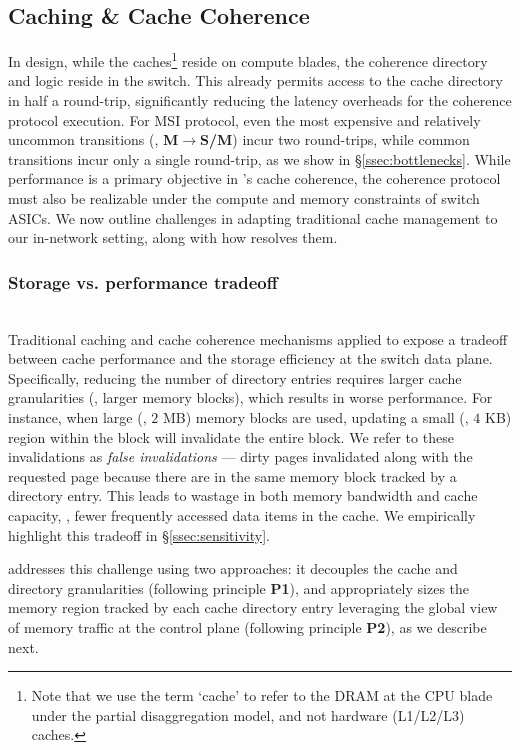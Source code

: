 \subsection{Caching \& Cache Coherence}
\label{ssec:caching}

In \mind design, while the caches\footnote{Note that we use the term `cache' to refer to the DRAM at the CPU blade under the partial disaggregation model, and not hardware (L1/L2/L3) caches.} reside on compute blades, the coherence directory and logic reside in the switch. This already permits access to the cache directory in half a round-trip, significantly reducing the latency overheads for the coherence protocol execution. For MSI protocol, even the most expensive and relatively uncommon transitions (\ie, \textbf{M}$\rightarrow$\textbf{S/M}) incur two round-trips, while common transitions incur only a single round-trip, as we show in \S\ref{ssec:bottlenecks}. While performance is a primary objective in \mind's cache coherence, the coherence protocol must also be realizable under the compute and memory constraints of switch ASICs. We now outline challenges in adapting traditional cache management to our in-network setting, along with how \mind resolves them.

\subsubsection{Storage vs. performance tradeoff}\label{ssec:storagevsperf}\hfill\\
Traditional caching and cache coherence mechanisms applied to \mind expose a tradeoff between cache performance and the storage efficiency at the switch data plane. Specifically, reducing the number of directory entries requires larger cache granularities (\ie, larger memory blocks), which results in worse performance. For instance, when large (\eg, $2$ MB) memory blocks are used, updating a small (\eg, $4$ KB) region within the block will invalidate the entire block. We refer to these invalidations as \emph{false invalidations} --- dirty pages invalidated along with the requested page because there are in the same memory block tracked by a directory entry. This leads to wastage in both memory bandwidth and cache capacity, \ie, fewer frequently accessed data items in the cache. We empirically highlight this tradeoff in \S\ref{ssec:sensitivity}.

\mind addresses this challenge using two approaches: it decouples the cache and directory granularities (following principle \textbf{P1}), and appropriately sizes the memory region tracked by each cache directory entry leveraging the global view of memory traffic at the control plane (following principle \textbf{P2}), as we describe next.

